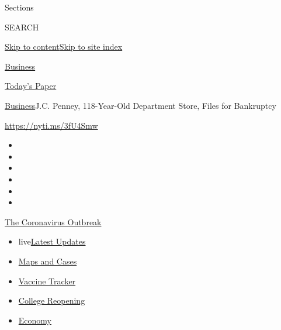 Sections

SEARCH

\protect\hyperlink{site-content}{Skip to
content}\protect\hyperlink{site-index}{Skip to site index}

\href{https://www.nytimes3xbfgragh.onion/section/business}{Business}

\href{https://myaccount.nytimes3xbfgragh.onion/auth/login?response_type=cookie\&client_id=vi}{}

\href{https://www.nytimes3xbfgragh.onion/section/todayspaper}{Today's
Paper}

\href{/section/business}{Business}\textbar{}J.C. Penney, 118-Year-Old
Department Store, Files for Bankruptcy

\url{https://nyti.ms/3fU4Smw}

\begin{itemize}
\item
\item
\item
\item
\item
\item
\end{itemize}

\href{https://www.nytimes3xbfgragh.onion/news-event/coronavirus?action=click\&pgtype=Article\&state=default\&region=TOP_BANNER\&context=storylines_menu}{The
Coronavirus Outbreak}

\begin{itemize}
\tightlist
\item
  live\href{https://www.nytimes3xbfgragh.onion/2020/08/03/world/coronavirus-covid-19.html?action=click\&pgtype=Article\&state=default\&region=TOP_BANNER\&context=storylines_menu}{Latest
  Updates}
\item
  \href{https://www.nytimes3xbfgragh.onion/interactive/2020/us/coronavirus-us-cases.html?action=click\&pgtype=Article\&state=default\&region=TOP_BANNER\&context=storylines_menu}{Maps
  and Cases}
\item
  \href{https://www.nytimes3xbfgragh.onion/interactive/2020/science/coronavirus-vaccine-tracker.html?action=click\&pgtype=Article\&state=default\&region=TOP_BANNER\&context=storylines_menu}{Vaccine
  Tracker}
\item
  \href{https://www.nytimes3xbfgragh.onion/2020/08/02/us/covid-college-reopening.html?action=click\&pgtype=Article\&state=default\&region=TOP_BANNER\&context=storylines_menu}{College
  Reopening}
\item
  \href{https://www.nytimes3xbfgragh.onion/live/2020/08/03/business/stock-market-today-coronavirus?action=click\&pgtype=Article\&state=default\&region=TOP_BANNER\&context=storylines_menu}{Economy}
\end{itemize}

